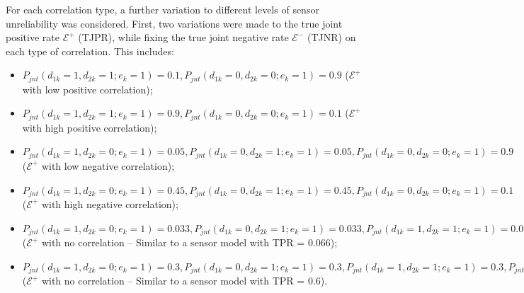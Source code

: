 For each correlation type, a further variation to different levels of sensor unreliability was considered. First, two variations were made to the true joint positive rate $\mathcal{E^+}$ (TJPR), while fixing the true joint negative rate $\mathcal{E^-}$ (TJNR) on each type of correlation. This includes:
\begin{itemize}
    \item $P_{jnt}(d_{1k}=1, d_{2k}=1 ; e_k=1) = 0.1, P_{jnt}(d_{1k}=0, d_{2k}=0 ; e_k=1) = 0.9$ ($\mathcal{E^+}$ with low positive correlation);
    \item $P_{jnt}(d_{1k}=1, d_{2k}=1 ; e_k=1) = 0.9, P_{jnt}(d_{1k}=0, d_{2k}=0 ; e_k=1) = 0.1$ ($\mathcal{E^+}$ with high positive correlation);
    \item $P_{jnt}(d_{1k}=1, d_{2k}=0 ; e_k=1) = 0.05, P_{jnt}(d_{1k}=0, d_{2k}=1 ; e_k=1) = 0.05, P_{jnt}(d_{1k}=0, d_{2k}=0 ; e_k=1) = 0.9$ ($\mathcal{E^+}$ with low negative correlation);
    \item $P_{jnt}(d_{1k}=1, d_{2k}=0 ; e_k=1) = 0.45, P_{jnt}(d_{1k}=0, d_{2k}=1 ; e_k=1) = 0.45, P_{jnt}(d_{1k}=0, d_{2k}=0 ; e_k=1) = 0.1$ ($\mathcal{E^+}$ with high negative correlation);
    \item $P_{jnt}(d_{1k}=1, d_{2k}=0 ; e_k=1) = 0.033, P_{jnt}(d_{1k}=0, d_{2k}=1 ; e_k=1) = 0.033, P_{jnt}(d_{1k}=1, d_{2k}=1 ; e_k=1) = 0.033, P_{jnt}(d_{1k}=0, d_{2k}=0 ; e_k=1) = 0.901$ ($\mathcal{E^+}$ with no correlation -- Similar to a sensor model with TPR = 0.066);
    \item $P_{jnt}(d_{1k}=1, d_{2k}=0 ; e_k=1) = 0.3, P_{jnt}(d_{1k}=0, d_{2k}=1 ; e_k=1) = 0.3, P_{jnt}(d_{1k}=1, d_{2k}=1 ; e_k=1) = 0.3, P_{jnt}(d_{1k}=0, d_{2k}=0 ; e_k=1) = 0.1$ ($\mathcal{E^+}$ with no correlation -- Similar to a sensor model with TPR = 0.6).
\end{itemize}

